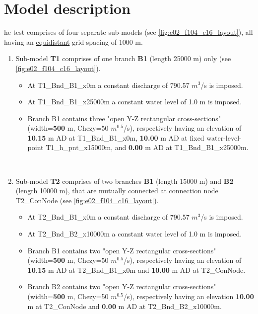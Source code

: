 \section*{Model description}
he test comprises of four separate sub-models (see \autoref{fig:e02_f104_c16_layout}), all having an \underline{equidistant} grid-spacing of 1000 m.
\begin{enumerate}
	\item Sub-model \textbf{\textcolor[rgb]{1,0,0}{T1}} comprises of one branch \textbf{B1} (length 25000 m) only (see \autoref{fig:e02_f104_c16_layout}).
		\begin{itemize}
			\item At T1\_Bnd\_B1\_x0m a constant discharge of 790.57 $m^3$/s is imposed. 
			\item At T1\_Bnd\_B1\_x25000m a constant water level of 1.0 m is imposed.
			\item Branch B1 contains three "open Y-Z rectangular cross-sections" (width=\textcolor[rgb]{0.071,0,1}{\textcolor[rgb]{0.5,0,0.15}{\textbf{500}}} m, Chezy=50 $m^{0.5}$/s), respectively having an elevation of \textbf{10.15} m AD at T1\_Bnd\_B1\_x0m, \textbf{10.00} m AD at fixed water-level-point T1\_h\_pnt\_x15000m, and \textbf{0.00} m AD at \newline T1\_Bnd\_B1\_x25000m.
		\end{itemize} \


	\item Sub-model \textbf{\textcolor[rgb]{1,0,0}{T2}} comprises of two branches \textbf{B1} (length 15000 m) and \textbf{B2} (length 10000 m), that are mutually connected at connection node T2\_ConNode (see \autoref{fig:e02_f104_c16_layout}). 
		\begin{itemize}
			\item At T2\_Bnd\_B1\_x0m a constant discharge of 790.57 $m^3$/s is imposed.
			\item At T2\_Bnd\_B2\_x10000m a constant water level of 1.0 m is imposed.
			\item Branch B1 contains two "open Y-Z rectangular cross-sections" (width=\textbf{\textcolor[rgb]{0.5,0,0.15}{500}} m, Chezy=50 $m^{0.5}$/s), respectively having an elevation of \textbf{10.15} m AD at T2\_Bnd\_B1\_x0m and \textbf{10.00} m AD at T2\_ConNode. 
			\item Branch B2 contains two "open Y-Z rectangular cross-sections" (width=\textbf{\textcolor[rgb]{0.5,0,0.15}{500}} m, Chezy=50 $m^{0.5}$/s), respectively having an elevation \textbf{10.00} m at T2\_ConNode and \textbf{0.00} m AD at \newline T2\_Bnd\_B2\_x10000m.
		\end{itemize} 
		

\end{enumerate}
